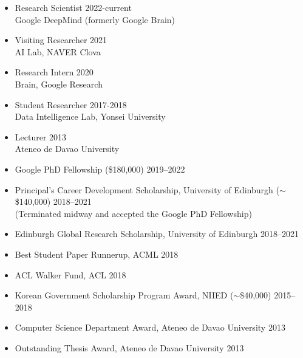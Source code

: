 \documentclass[11pt]{article}
\renewcommand{\section}[1]
{\vspace{1.0\baselineskip}{\Large\textbf{#1}}}
\begin{document}
\begin{itemize}[leftmargin=12pt]
  \item[] Research Scientist \hfill 2022-current \\
  Google DeepMind (formerly Google Brain)
	
  \item[] Visiting Researcher \hfill 2021 \\
  AI Lab, NAVER Clova
  
  \item[] Research Intern \hfill 2020 \\
  Brain, Google Research
  
  \item[] Student Researcher \hfill 2017-2018 \\
  Data Intelligence Lab, Yonsei University
  
  \item[] Lecturer \hfill 2013 \\
  Ateneo de Davao University
\end{itemize}

\section{Awards}

\begin{itemize}[leftmargin=12pt]
  \item[] Google PhD Fellowship 
  {\small (\$180,000)}
  \hfill 2019--2022
  
  \item[] Principal’s Career Development Scholarship, University of Edinburgh 
  {\small ($\sim$\$140,000)}
  \hfill 2018--2021\\
  {\footnotesize (Terminated midway and accepted the Google PhD Fellowship)}
  
  \item[] Edinburgh Global Research Scholarship, University of Edinburgh \hfill 2018--2021
  
  \item[] Best Student Paper Runnerup, ACML \hfill 2018
  
  \item[] ACL Walker Fund, ACL \hfill 2018
  
  \item[] Korean Government Scholarship Program Award, NIIED 
  {\small ($\sim$\$40,000)} 
  \hfill 2015--2018
  
  \item[] Computer Science Department Award, Ateneo de Davao University \hfill 2013
  
  \item[] Outstanding Thesis Award, Ateneo de Davao University \hfill 2013
\end{itemize}
\end{document}
